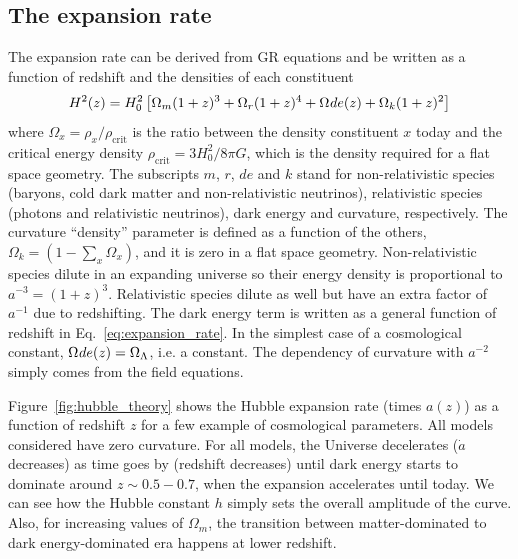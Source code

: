     \subsection{The expansion rate}
    \label{intro:model:expansion_rate}

    The expansion rate can be derived from GR equations and be written as a function of 
    redshift and the densities of each constituent
    \begin{equation}
        H^2(z) = H^2_0 \left[ \Omega_m(1+z)^3 + \Omega_r (1+z)^4 + \Omega_\mathrm\mathrm{de}(z) + \Omega_k(1+z)^2\right]
        \label{eq:expansion_rate}
    \end{equation}
    where $\Omega_x = \rho_x / \rho_\mathrm{ crit}$ is the ratio between the density 
    constituent $x$ today and the critical energy density $\rho_\mathrm{ crit} = 3H_0^2/8\pi G$, 
    which is the density required for a flat space geometry. 
    The subscripts $m$, $r$, $de$ and $k$ stand
    for non-relativistic species (baryons, cold dark matter and non-relativistic neutrinos), 
    relativistic species (photons and relativistic neutrinos), dark energy and curvature, 
    respectively. The curvature ``density'' parameter is defined as a function of the others,
    $\Omega_k = (1-\sum_x \Omega_x)$, and it is zero in a flat space geometry.
    Non-relativistic species dilute in an expanding universe so their energy density is 
    proportional to $a^{-3} = (1+z)^3$. Relativistic species dilute as well but have an
    extra factor of $a^{-1}$ due to redshifting. 
    The dark energy term is written as a general function of redshift in Eq.~\ref{eq:expansion_rate}.
    In the simplest case of a cosmological constant, $\Omega_\mathrm\mathrm{de}(z) = \Omega_\Lambda$, i.e. a constant.
    The dependency of curvature with $a^{-2}$ simply comes from the field equations. 

    Figure~\ref{fig:hubble_theory} shows the Hubble expansion rate (times $a(z)$) as a function of redshift $z$
    for a few example of cosmological parameters. All models considered have zero curvature. 
    For all models, the Universe decelerates ($\dot{a}$ decreases) as time goes by (redshift decreases) 
    until dark energy starts to dominate around $z\sim 0.5-0.7$, when the expansion accelerates until today. 
    We can see how the Hubble constant $h$ simply sets the overall amplitude of the curve.
    Also, for increasing values of $\Omega_m$, the transition between matter-dominated to dark energy-dominated era 
    happens at lower redshift. 


